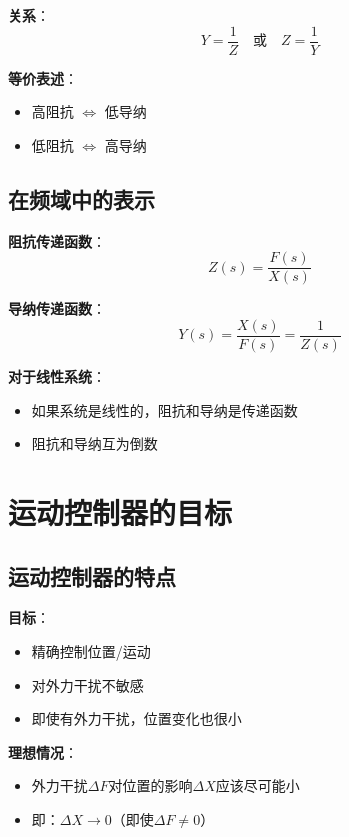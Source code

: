 \documentclass[12pt,a4paper]{article}
\begin{document}
\textbf{关系}：
\begin{equation}
Y = \frac{1}{Z} \quad \text{或} \quad Z = \frac{1}{Y}
\end{equation}

\textbf{等价表述}：
\begin{itemize}
\item 高阻抗 $\Leftrightarrow$ 低导纳
\item 低阻抗 $\Leftrightarrow$ 高导纳
\end{itemize}

\subsection{在频域中的表示}

\textbf{阻抗传递函数}：
\begin{equation}
Z(s) = \frac{F(s)}{X(s)}
\end{equation}

\textbf{导纳传递函数}：
\begin{equation}
Y(s) = \frac{X(s)}{F(s)} = \frac{1}{Z(s)}
\end{equation}

\textbf{对于线性系统}：
\begin{itemize}
\item 如果系统是线性的，阻抗和导纳是传递函数
\item 阻抗和导纳互为倒数
\end{itemize}

\section{运动控制器的目标}

\subsection{运动控制器的特点}

\textbf{目标}：
\begin{itemize}
\item 精确控制位置/运动
\item 对外力干扰不敏感
\item 即使有外力干扰，位置变化也很小
\end{itemize}

\textbf{理想情况}：
\begin{itemize}
\item 外力干扰$\Delta F$对位置的影响$\Delta X$应该尽可能小
\item 即：$\Delta X \to 0$（即使$\Delta F \neq 0$）
\end{itemize}
\end{document}
